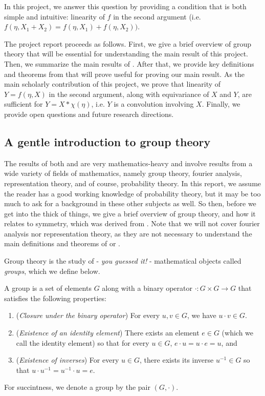 In this project, we answer this question by providing a condition that is both simple and intuitive: linearity of $f$ in the second argument (i.e. $f(\eta, X_1 + X_2) = f(\eta, X_1) + f(\eta, X_2))$.

The project report proceeds as follows.
First, we give a brief overview of group theory that will be essential for understanding the main result of this project.
Then, we summarize the main results of \cite{bloemreddy2019probabilistic}.
After that, we provide key definitions and theorems from \cite{kondor2018generalization} that will prove useful for proving our main result.
As the main scholarly contribution of this project, we prove that linearity of $Y = f(\eta,X)$ in the second argument, along with equivariance of $X$ and $Y$, are sufficient for $Y = X * \chi(\eta)$, i.e. $Y$ is a convolution involving $X$.
Finally, we provide open questions and future research directions.

\subsection{A gentle introduction to group theory}
The results of both \cite{bloemreddy2019probabilistic} and \cite{kondor2018generalization} are very mathematics-heavy and involve results from a wide variety of fields of mathematics, namely group theory, fourier analysis, representation theory, and of course, probability theory.
In this report, we assume the reader has a good working knowledge of probability theory, but it may be too much to ask for a background in these other subjects as well.
So then, before we get into the thick of things, we give a brief overview of group theory, and how it relates to symmetry, which was derived from \cite{RomanSteven2012FoGT}.
Note that we will not cover fourier analysis nor representation theory, as they are not necessary to understand the main definitions and theorems of \cite{bloemreddy2019probabilistic} or \cite{kondor2018generalization}.

Group theory is the study of - \textit{you guessed it!} - mathematical objects called \textit{groups}, which we define below.

\begin{definition} \label{def:group}
A group is a set of elements $G$ along with a binary operator $\cdot : G \times G \to G$ that satisfies the following properties:
\begin{enumerate}[label=(\alph*)]
	\item
	(\textit{Closure under the binary operator})
	For every $u,v \in G$, we have $u \cdot v \in G$.
	\item
	(\textit{Existence of an identity element})
	There exists an element $e \in G$ (which we call the identity element) so that for every $u \in G$, $e \cdot u = u \cdot e = u$, and
	\item
	(\textit{Existence of inverses})
	For every $u \in G$, there exists its inverse $u^{-1} \in G$ so that $u \cdot u^{-1} = u^{-1} \cdot u = e$.
\end{enumerate}
For succintness, we denote a group by the pair $(G,\cdot)$.
\end{definition}

